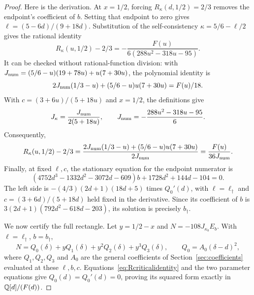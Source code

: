 \begin{proof}
Here is the derivation. At $x=1/2$, forcing $R_\kappa(d,1/2)=2/3$ removes the endpoint's coefficient of $b$. Setting that endpoint to zero gives $\ell=(5-6d)/(9+18d)$. Substitution of the self-consistency $\kappa=5/6-\ell/2$ gives the rational identity
\begin{equation}\label{eq:Rcriticalidentity}
 R_\kappa(u,1/2)-2/3
       =-\frac{F(u)}{6(288u^2-318u-95)}.
\end{equation}
It can be checked without rational-function division: with
$J_{\rm num}=(5/6-u)(19+78u)+u(7+30u)$, the polynomial identity is
\[
 2J_{\rm num}(1/3-u)+(5/6-u)u(7+30u)=F(u)/18.
\]
With $c=(3+6u)/(5+18u)$ and $x=1/2$, the definitions give
\[
 J_\kappa=\frac{J_{\rm num}}{2(5+18u)},\qquad
 J_{\rm num}=-\frac{288u^2-318u-95}{6}.
\]
Consequently,
\[
 R_\kappa(u,1/2)-2/3
 =\frac{2J_{\rm num}(1/3-u)+(5/6-u)u(7+30u)}{2J_{\rm num}}
 =\frac{F(u)}{36J_{\rm num}}.
\]
Finally, at fixed $\ell,c$, the stationary equation for the endpoint numerator is
\[
 (4752d^3-1332d^2-3072d-609)b+1728d^2+144d-104=0.
\]
The left side is $-(4/3)(2d+1)(18d+5)$ times $Q_0'(d)$, with $\ell=\ell_\dagger$ and $c=(3+6d)/(5+18d)$ held fixed in the derivative. Since its coefficient of $b$ is $3(2d+1)(792d^2-618d-203)$, its solution is precisely $b_\dagger$.

We now certify the full rectangle. Let $y=1/2-x$ and $N=-108J_{\kappa_b}E_b$. With $\ell=\ell_\dagger$, $b=b_\dagger$,
\begin{equation}\label{eq:cubicpoly}
 N=Q_0(\delta)+yQ_1(\delta)+y^2Q_2(\delta)+y^3Q_3(\delta),
 \qquad Q_0=A_0(\delta-d)^2,
\end{equation}
where $Q_1,Q_2,Q_3$ and $A_0$ are the general coefficients of Section~\ref{sec:coefficients} evaluated at these $\ell,b,c$.
Equations~\eqref{eq:Rcriticalidentity} and the two parameter equations give $Q_0(d)=Q_0'(d)=0$, proving its squared form exactly in $\mathbb Q[d]/(F(d))$.


\end{proof}

